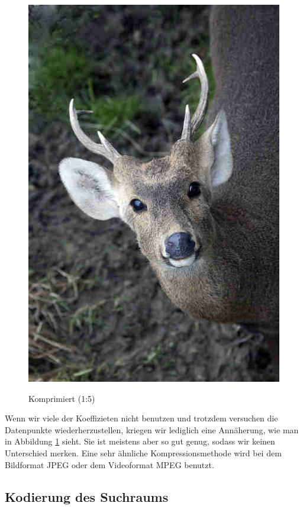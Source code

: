 \begin{multicols}{2}
\begin{figure}[H]
\begin{center}
                    \includegraphics[scale=0.239]{../pictures/gazelle-compressed.jpg}\\
                    \caption{Komprimiert (1:5)}\label{fig:gazelle-compressed}
                \end{center}
            \end{figure}
        \end{multicols}

        \noindent
        Wenn wir viele der Koeffizieten nicht benutzen und trotzdem versuchen die Datenpunkte wiederherzustellen, kriegen wir lediglich eine Annäherung, wie man in Abbildung \ref{fig:gazelle-compressed} sieht. Sie ist meistens aber so gut genug, sodass wir keinen Unterschied merken. Eine sehr ähnliche Kompressionsmethode wird bei dem Bildformat JPEG oder dem Videoformat MPEG benutzt.

        \subsection{Kodierung des Suchraums}

